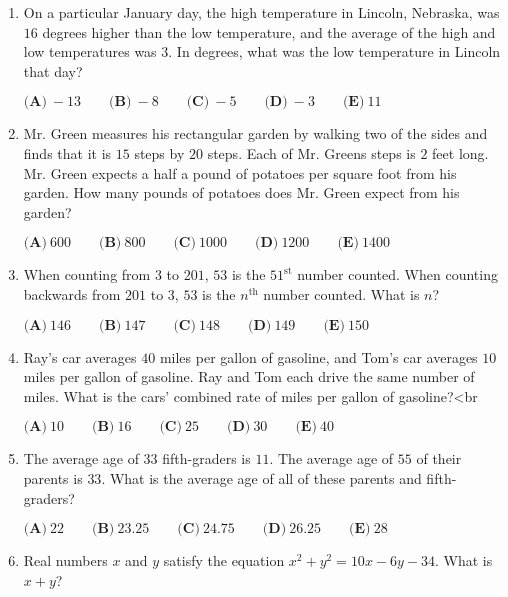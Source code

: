 \documentclass{article}
\begin{document}
\begin{enumerate}[label=\arabic*., itemsep=0.5em]\item On a particular January day, the high temperature in Lincoln, Nebraska, was \(16\) degrees higher than the low temperature, and the average of the high and low temperatures was \(3\). In degrees, what was the low temperature in Lincoln that day?

\(\textbf{(A)}\ -13 \qquad \textbf{(B)}\ -8 \qquad \textbf{(C)}\ -5 \qquad \textbf{(D)}\ -3 \qquad \textbf{(E)}\ 11\)\par \vspace{0.5em}\item Mr. Green measures his rectangular garden by walking two of the sides and finds that it is \(15\) steps by \(20\) steps. Each of Mr. Greens steps is \(2\) feet long. Mr. Green expects a half a pound of potatoes per square foot from his garden. How many pounds of potatoes does Mr. Green expect from his garden?

\(\textbf{(A)}\ 600 \qquad \textbf{(B)}\ 800 \qquad \textbf{(C)}\ 1000 \qquad \textbf{(D)}\ 1200 \qquad \textbf{(E)}\ 1400\)\par \vspace{0.5em}\item When counting from \(3\) to \(201\), \(53\) is the \(51^{\text{st}}\) number counted. When counting backwards from \(201\) to \(3\), \(53\) is the \(n^{\text{th}}\) number counted. What is \(n\)?

\(\textbf{(A)}\ 146 \qquad \textbf{(B)}\ 147 \qquad \textbf{(C)}\ 148 \qquad \textbf{(D)}\ 149 \qquad \textbf{(E)}\ 150\)\par \vspace{0.5em}\item Ray's car averages \(40\) miles per gallon of gasoline, and Tom's car averages \(10\) miles per gallon of gasoline. Ray and Tom each drive the same number of miles. What is the cars' combined rate of miles per gallon of gasoline?<br \>

\(\textbf{(A)}\ 10 \qquad \textbf{(B)}\ 16 \qquad \textbf{(C)}\ 25 \qquad \textbf{(D)}\ 30 \qquad \textbf{(E)}\ 40\)\par \vspace{0.5em}\item The average age of \(33\) fifth-graders is \(11\). The average age of \(55\) of their parents is \(33\). What is the average age of all of these parents and fifth-graders?

\(\textbf{(A)}\ 22 \qquad \textbf{(B)}\ 23.25 \qquad \textbf{(C)}\ 24.75 \qquad \textbf{(D)}\ 26.25 \qquad \textbf{(E)}\ 28\)\par \vspace{0.5em}\item Real numbers \(x\) and \(y\) satisfy the equation \(x^2 + y^2 = 10x - 6y - 34\). What is \(x + y\)?


\end{enumerate}
\end{document}
